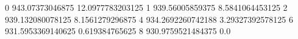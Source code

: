0 943.07373046875 12.0977783203125
1 939.56005859375 8.5841064453125
2 939.132080078125 8.1561279296875
4 934.2692260742188 3.29327392578125
6 931.5953369140625 0.619384765625
8 930.9759521484375 0.0
